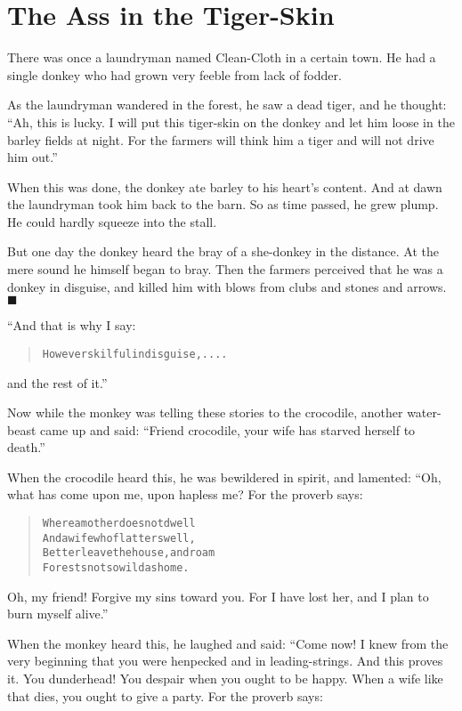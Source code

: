 \documentclass[article, twoside, 14pt]{memoir}
\newcommand{\qed}{\hfill \ensuremath{\blacksquare}}
\renewenvironment{verbatim}{%
\begin{quote}%
\vskip -10pt%
\begin{alltt}\normalfont\large}{\end{alltt}%
\end{quote}%
\vskip -10pt
} %
\begin{document}
\chapter{The Ass in the Tiger-Skin}

\label{s73}

There was once a laundryman named Clean-Cloth in a certain town. He
had a single donkey who had grown very feeble from lack of fodder.

As the laundryman wandered in the forest, he saw a dead tiger, and
he thought:
``Ah, this is lucky. I will put this tiger-skin on the donkey and let him loose in the barley fields at night. For the farmers will think him a tiger and will not drive him out.''

When this was done, the donkey ate barley to his heart's content.
And at dawn the laundryman took him back to the barn. So as time
passed, he grew plump. He could hardly squeeze into the
stall.

But one day the donkey heard the bray of a she-donkey in the
distance. At the mere sound he himself began to bray. Then the
farmers perceived that he was a donkey in disguise, and killed him
with blows from clubs and stones and arrows.\hyperref[s73]{\qed}

“And that is why I say:

\begin{verbatim}
However skilful in disguise, ....
\end{verbatim}
and the rest of it.”

Now while the monkey was telling these stories to the crocodile,
another water-beast came up and said:
``Friend crocodile, your wife has starved herself to death.''

When the crocodile heard this, he was bewildered in spirit, and
lamented: “Oh, what has come upon me, upon hapless me? For the
proverb says:

\begin{verbatim}
Where a mother does not dwell
And a wife who flatters well,
Better leave the house, and roam
Forests not so wild as home.
\end{verbatim}
Oh, my friend! Forgive my sins toward you. For I have lost her, and
I plan to burn myself alive.”

When the monkey heard this, he laughed and said: “Come now! I knew
from the very beginning that you were henpecked and in
leading-strings. And this proves it. You dunderhead! You despair
when you ought to be happy. When a wife like that dies, you ought
to give a party. For the proverb says:
\end{document}

